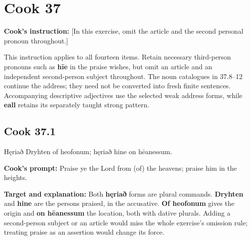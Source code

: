 \clearpage
\section*{Cook 37}

\textbf{Cook's instruction:} [In this exercise, omit the article and the second personal pronoun throughout.]

This instruction applies to all fourteen items. Retain necessary third-person pronouns such as \textbf{hīe} in the praise wishes, but omit an article and an independent second-person subject throughout. The noun catalogues in 37.8–12 continue the address; they need not be converted into fresh finite sentences. Accompanying descriptive adjectives use the selected weak address forms, while \textbf{eall} retains its separately taught strong pattern.

\par\begin{minipage}{\linewidth}\raggedright
\subsection*{Cook 37.1}

Hęriað Dryhten of heofonum; hęriað hine on hēanessum.

\textbf{Cook's prompt:} Praise ye the Lord from (of) the heavens; praise him in the heights.

\textbf{Target and explanation:} Both \textbf{hęriað} forms are plural commands. \textbf{Dryhten} and \textbf{hine} are the persons praised, in the accusative. \textbf{Of heofonum} gives the origin and \textbf{on hēanessum} the location, both with dative plurals. Adding a second-person subject or an article would miss the whole exercise's omission rule; treating praise as an assertion would change its force.

\end{minipage}\par\addvspace{4pt}


